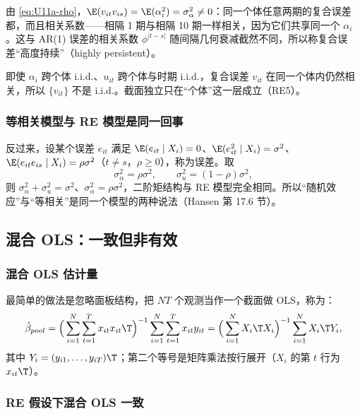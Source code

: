 由 \eqref{eq:U11a-rho}，$\E(v_{it}v_{is})=\E(\alpha_i^2)=\sigma_\alpha^2\neq0$：同一个体任意两期的复合误差都，而且相关系数——相隔 1 期与相隔 10 期一样相关，因为它们共享同一个 $\alpha_i$。这与 AR(1) 误差的相关系数 $\phi^{|t-s|}$ 随间隔几何衰减截然不同，所以称复合误差“高度持续”（highly persistent）。

\begin{note}
即使 $\alpha_i$ 跨个体 i.i.d.、$u_{it}$ 跨个体与时期 i.i.d.，复合误差 $v_{it}$ 在同一个体内仍然相关，所以 $\{v_{it}\}$ 不是 i.i.d.。截面独立只在“个体”这一层成立（RE5）。
\end{note}

\subsubsection{等相关模型与 RE 模型是同一回事}

反过来，设某个误差 $e_{it}$ 满足 $\E(e_{it}\mid X_i)=0$、$\E(e_{it}^2\mid X_i)=\sigma^2$、$\E(e_{it}e_{is}\mid X_i)=\rho\sigma^2$（$t\ne s$，$\rho\ge0$），称为误差。取
\[
\sigma_\alpha^2=\rho\sigma^2,\qquad \sigma_u^2=(1-\rho)\sigma^2,
\]
则 $\sigma_\alpha^2+\sigma_u^2=\sigma^2$、$\sigma_\alpha^2=\rho\sigma^2$，二阶矩结构与 RE 模型完全相同。所以“随机效应”与“等相关”是同一个模型的两种说法（Hansen 第 17.6 节）。

\subsection{混合 OLS：一致但非有效}

\subsubsection{混合 OLS 估计量}

最简单的做法是忽略面板结构，把 $NT$ 个观测当作一个截面做 OLS，称为：
\begin{equation}\label{eq:U11a-pool}
\hat\beta_{pool}=\Big(\sum_{i=1}^N\sum_{t=1}^Tx_{it}x_{it}\T\Big)^{-1}\sum_{i=1}^N\sum_{t=1}^Tx_{it}y_{it}
=\Big(\sum_{i=1}^NX_i\T X_i\Big)^{-1}\sum_{i=1}^NX_i\T Y_i,
\end{equation}
其中 $Y_i=(y_{i1},\dots,y_{iT})\T$；第二个等号是矩阵乘法按行展开（$X_i$ 的第 $t$ 行为 $x_{it}\T$）。

\subsubsection{RE 假设下混合 OLS 一致}

